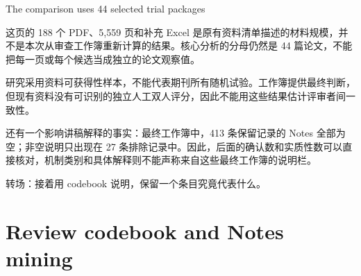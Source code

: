 \documentclass[10pt,aspectratio=169]{beamer}
\begin{document}
\begin{frame}[t]{The comparison uses 44 selected trial packages}
{\par
这页的 188 个 PDF、5,559 页和补充 Excel 是原有资料清单描述的材料规模，并不是本次从审查工作簿重新计算的结果。核心分析的分母仍然是 44 篇论文，不能把每一页或每个候选当成独立的论文观察值。
\par
研究采用资料可获得性样本，不能代表期刊所有随机试验。工作簿提供最终判断，但现有资料没有可识别的独立人工双人评分，因此不能用这些结果估计评审者间一致性。
\par
还有一个影响讲稿解释的事实：最终工作簿中，413 条保留记录的 Notes 全部为空；非空说明只出现在 27 条排除记录中。因此，后面的确认数和实质性数可以直接核对，机制类别和具体解释则不能声称来自这些最终工作簿的说明栏。
\par
转场：接着用 codebook 说明，保留一个条目究竟代表什么。
}
\end{frame}

\section{Review codebook and Notes mining}
\end{document}
